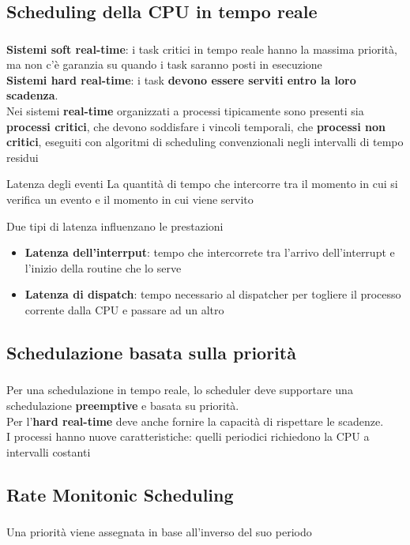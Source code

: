 \documentclass{beamer}
\newenvironment{mainframe}{
	\begin{frame}
		\frametitle{\insertsubsection}
		\framesubtitle{\insertsection}
	}{
	\end{frame}
}
\begin{document}
\subsection{Scheduling della CPU in tempo reale}
\begin{mainframe}
	\textbf{Sistemi soft real-time}: i task critici in tempo reale hanno la massima priorità, ma non c'è garanzia su quando i task saranno posti in esecuzione\\
	\textbf{Sistemi hard real-time}: i task \textbf{devono essere serviti entro la loro scadenza}.\\
	Nei sistemi \textbf{real-time} organizzati a processi tipicamente sono presenti sia \textbf{processi critici}, che devono soddisfare i vincoli temporali, che \textbf{processi non critici}, eseguiti con algoritmi di scheduling convenzionali negli intervalli di tempo residui\\
\end{mainframe}
\begin{frame}
	\begin{block}{Latenza degli eventi}
		La quantità di tempo che intercorre tra il momento in cui si verifica un evento e il momento in cui viene servito
	\end{block}
	Due tipi di latenza influenzano le prestazioni
	\begin{itemize}
		\item \textbf{Latenza dell'interrput}: tempo che intercorrete tra l'arrivo dell'interrupt e l'inizio della routine che lo serve
		\item \textbf{Latenza di dispatch}: tempo necessario al dispatcher per togliere il processo corrente dalla CPU e passare ad un altro
	\end{itemize}
\end{frame}
\subsection{Schedulazione basata sulla priorità}
\begin{mainframe}
	Per una schedulazione in tempo reale, lo scheduler deve supportare una schedulazione \textbf{preemptive} e basata su priorità.\\
	Per l'\textbf{hard real-time} deve anche fornire la capacità di rispettare le scadenze.\\
	I processi hanno nuove caratteristiche: quelli periodici richiedono la CPU a intervalli costanti
\end{mainframe}
\subsection{Rate Monitonic Scheduling}
\begin{mainframe}
	Una priorità viene assegnata in base all'inverso del suo periodo
\end{mainframe}
\end{document}

